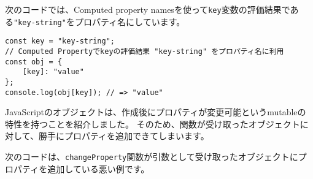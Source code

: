 次のコードでは、Computed property
namesを使って\texttt{key}変数の評価結果である\texttt{"key-string"}をプロパティ名にしています。

\begin{lstlisting}
const key = "key-string";
// Computed Propertyでkeyの評価結果 "key-string" をプロパティ名に利用
const obj = {
    [key]: "value"
};
console.log(obj[key]); // => "value"
\end{lstlisting}

JavaScriptのオブジェクトは、作成後にプロパティが変更可能というmutableの特性を持つことを紹介しました。
そのため、関数が受け取ったオブジェクトに対して、勝手にプロパティを追加できてしまいます。

次のコードは、\texttt{changeProperty}関数が引数として受け取ったオブジェクトにプロパティを追加している悪い例です。

